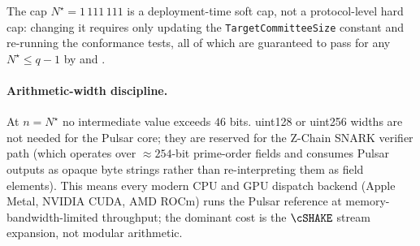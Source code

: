 The cap $N^\star = 1\,111\,111$ is a deployment-time soft cap, not
a protocol-level hard cap: changing it requires only updating the
\texttt{TargetCommitteeSize} constant and re-running the conformance
tests, all of which are guaranteed to pass for any
$N^\star \le q - 1$ by  and
.

\paragraph{Arithmetic-width discipline.}
At $n = N^\star$ no intermediate value exceeds $46$ bits. uint128 or
uint256 widths are not needed for the Pulsar core; they are
reserved for the Z-Chain SNARK verifier path (which operates over
$\approx 254$-bit prime-order fields and consumes Pulsar outputs
as opaque byte strings rather than re-interpreting them as field
elements). This means every modern CPU and GPU dispatch backend
(Apple Metal, NVIDIA CUDA, AMD ROCm) runs the Pulsar reference
at memory-bandwidth-limited throughput; the dominant cost is the
$\cSHAKE$ stream expansion, not modular arithmetic.

